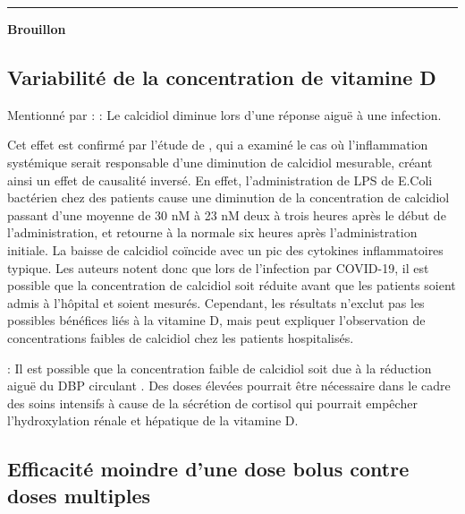 \documentclass[
  a4paper,
  DIV=11,
  numbers=noendperiod,
  listof=totoc]{scrreprt}
\begin{document}
\begin{center}\rule{0.5\linewidth}{0.5pt}\end{center}

\textbf{Brouillon}

\textcite{Freitas.2021} \textcite{Onoja.2022}
\textcite{Delgado-Wicke.2024}

\subsection{Variabilité de la concentration de vitamine
D}\label{variabilituxe9-de-la-concentration-de-vitamine-d}

Mentionné par \textcite{Crafa.2021} : \textcite{Reijven.2020}
\textcite{Silva.2015} : Le calcidiol diminue lors d'une réponse aiguë à
une infection.

Cet effet est confirmé par l'étude de \textcite{Smolders.2021}, qui a
examiné le cas où l'inflammation systémique serait responsable d'une
diminution de calcidiol mesurable, créant ainsi un effet de causalité
inversé. En effet, l'administration de \ac{LPS} de E.Coli bactérien chez
des patients cause une diminution de la concentration de calcidiol
passant d'une moyenne de 30 nM à 23 nM deux à trois heures après le
début de l'administration, et retourne à la normale six heures après
l'administration initiale. La baisse de calcidiol coïncide avec un pic
des cytokines inflammatoires typique. Les auteurs notent donc que lors
de l'infection par COVID-19, il est possible que la concentration de
calcidiol soit réduite avant que les patients soient admis à l'hôpital
et soient mesurés. Cependant, les résultats n'exclut pas les possibles
bénéfices liés à la vitamine D, mais peut expliquer l'observation de
concentrations faibles de calcidiol chez les patients hospitalisés.

\textcite{Giustina.2020} : Il est possible que la concentration faible
de calcidiol soit due à la réduction aiguë du \ac{DBP} circulant
\autocite{Christopher.2016}. Des doses élevées pourrait être nécessaire
dans le cadre des soins intensifs à cause de la sécrétion de cortisol
qui pourrait empêcher l'hydroxylation rénale et hépatique de la vitamine
D.

\subsection{Efficacité moindre d'une dose bolus contre doses
multiples}\label{efficacituxe9-moindre-dune-dose-bolus-contre-doses-multiples}
\end{document}
